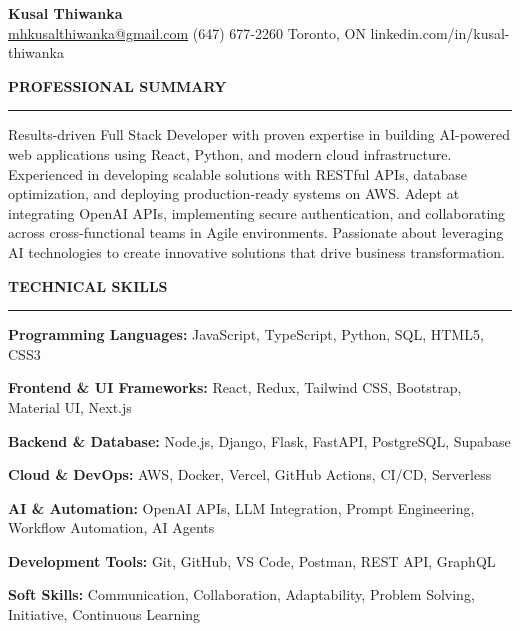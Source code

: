 \documentclass[10pt,letterpaper]{article}
\begin{document}
\begin{center}
{\LARGE\textbf{Kusal Thiwanka}}\\[3pt]
\href{mailto:mhkusalthiwanka@gmail.com}{mhkusalthiwanka@gmail.com}\hspace{2em}%
(647) 677{-}2260\hspace{2em}%
Toronto, ON\hspace{2em}
linkedin.com/in/kusal-thiwanka
\end{center}

\vspace{6pt}

\textbf{PROFESSIONAL SUMMARY}\\[-8pt]
\noindent\rule{\textwidth}{1pt}

\vspace{-2pt}

Results-driven Full Stack Developer with proven expertise in building AI-powered web applications using React, Python, and modern cloud infrastructure. Experienced in developing scalable solutions with RESTful APIs, database optimization, and deploying production-ready systems on AWS. Adept at integrating OpenAI APIs, implementing secure authentication, and collaborating across cross-functional teams in Agile environments. Passionate about leveraging AI technologies to create innovative solutions that drive business transformation.

\vspace{8pt}

\textbf{TECHNICAL SKILLS}\\[-8pt]
\noindent\rule{\textwidth}{1pt}

\vspace{-2pt}

\textbf{Programming Languages:} JavaScript, TypeScript, Python, SQL, HTML5, CSS3

\textbf{Frontend \& UI Frameworks:} React, Redux, Tailwind CSS, Bootstrap, Material UI, Next.js

\textbf{Backend \& Database:} Node.js, Django, Flask, FastAPI, PostgreSQL, Supabase

\textbf{Cloud \& DevOps:} AWS, Docker, Vercel, GitHub Actions, CI/CD, Serverless

\textbf{AI \& Automation:} OpenAI APIs, LLM Integration, Prompt Engineering, Workflow Automation, AI Agents

\textbf{Development Tools:} Git, GitHub, VS Code, Postman, REST API, GraphQL

\textbf{Soft Skills:} Communication, Collaboration, Adaptability, Problem Solving, Initiative, Continuous Learning
\end{document}
